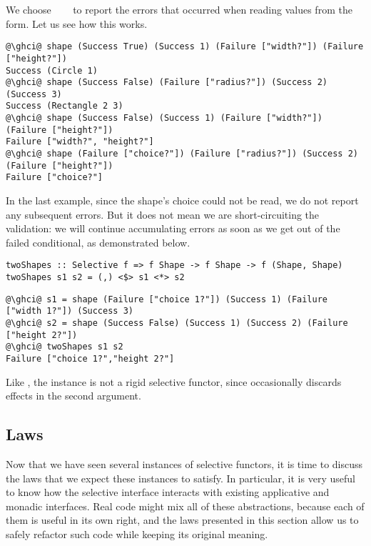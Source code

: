 {\noindent
We choose ~\hs{=}~~\hs{[String]} to report the errors that
occurred when reading values from the form. Let us see how this works.

\vspace{0.5mm}
\begin{verbatim}
@\ghci@ shape (Success True) (Success 1) (Failure ["width?"]) (Failure ["height?"])
Success (Circle 1)
@\ghci@ shape (Success False) (Failure ["radius?"]) (Success 2) (Success 3)
Success (Rectangle 2 3)
@\ghci@ shape (Success False) (Success 1) (Failure ["width?"]) (Failure ["height?"])
Failure ["width?", "height?"]
@\ghci@ shape (Failure ["choice?"]) (Failure ["radius?"]) (Success 2) (Failure ["height?"])
Failure ["choice?"]
\end{verbatim}
\vspace{0.5mm}

\noindent
In the last example, since the shape's choice could not be read, we do not
report any subsequent errors. But it does not mean we are short-circuiting the
validation: we will continue accumulating errors as soon as we get out of the
failed conditional, as demonstrated below.

\vspace{0.5mm}
\begin{verbatim}
twoShapes :: Selective f => f Shape -> f Shape -> f (Shape, Shape)
twoShapes s1 s2 = (,) <$> s1 <*> s2
\end{verbatim}
\vspace{0.5mm}
\begin{verbatim}
@\ghci@ s1 = shape (Failure ["choice 1?"]) (Success 1) (Failure ["width 1?"]) (Success 3)
@\ghci@ s2 = shape (Success False) (Success 1) (Success 2) (Failure ["height 2?"])
@\ghci@ twoShapes s1 s2
Failure ["choice 1?","height 2?"]
\end{verbatim}
\vspace{0.5mm}

\noindent
Like , the  instance is not a rigid selective functor,
since  occasionally discards effects in the second argument.

\subsection{Laws}\label{sec-laws}

Now that we have seen several instances of selective functors, it is time to
discuss the laws that we expect these instances to satisfy. In particular, it is
very useful to know how the selective interface interacts with existing
applicative and monadic interfaces. Real code might mix all of these
abstractions, because each of them is useful in its own right, and the laws
presented in this section allow us to safely refactor such code while keeping
its original meaning.

}
